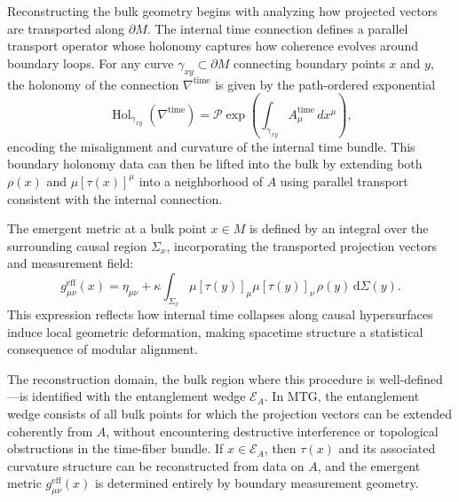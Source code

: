 \documentclass[11pt]{article}
\begin{document}
Reconstructing the bulk geometry begins with analyzing how projected vectors are transported along \( \partial M \). The internal time connection defines a parallel transport operator whose holonomy captures how coherence evolves around boundary loops. For any curve \( \gamma_{xy} \subset \partial M \) connecting boundary points \( x \) and \( y \), the holonomy of the connection \( \nabla^{\mathrm{time}} \) is given by the path-ordered exponential
\begin{equation}
\operatorname{Hol}_{\gamma_{xy}}(\nabla^{\mathrm{time}}) = \mathcal{P} \exp\left( \int_{\gamma_{xy}} A^{\mathrm{time}}_\mu \, dx^\mu \right),
\end{equation}
encoding the misalignment and curvature of the internal time bundle. This boundary holonomy data can then be lifted into the bulk by extending both \( \rho(x) \) and \( \mu[\tau(x)]^\mu \) into a neighborhood of \( A \) using parallel transport consistent with the internal connection.

The emergent metric at a bulk point \( x \in M \) is defined by an integral over the surrounding causal region \( \Sigma_x \), incorporating the transported projection vectors and measurement field:
\begin{equation}
g^{\mathrm{eff}}_{\mu\nu}(x) = \eta_{\mu\nu} + \kappa \int_{\Sigma_x} \mu[\tau(y)]_\mu \mu[\tau(y)]_\nu \, \rho(y) \, \mathrm{d}\Sigma(y).
\end{equation}
This expression reflects how internal time collapses along causal hypersurfaces induce local geometric deformation, making spacetime structure a statistical consequence of modular alignment.

The reconstruction domain, the bulk region where this procedure is well-defined—is identified with the entanglement wedge \( \mathcal{E}_A \). In MTG, the entanglement wedge consists of all bulk points for which the projection vectors can be extended coherently from \( A \), without encountering destructive interference or topological obstructions in the time-fiber bundle. If \( x \in \mathcal{E}_A \), then \( \tau(x) \) and its associated curvature structure can be reconstructed from data on \( A \), and the emergent metric \( g^{\mathrm{eff}}_{\mu\nu}(x) \) is determined entirely by boundary measurement geometry.
\end{document}
